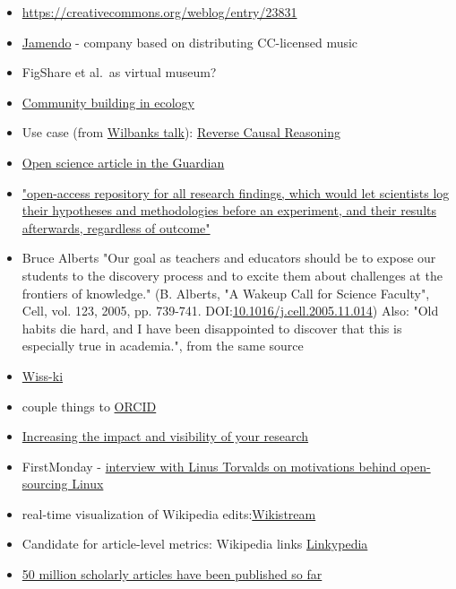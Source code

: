 \documentclass[final,authoryear,3p]{elsarticle-open-drafting}
\begin{document}
\begin{itemize}
	\item \href{https://creativecommons.org/weblog/entry/23831}{https://creativecommons.org/weblog/entry/23831}
	\item \href{http://www.jamendo.com/en/creativecommons}{Jamendo} - company based on distributing CC-licensed music
	\item FigShare et al.\ as virtual museum?
	\item \href{http://dx.doi.org/10.1038/npre.2010.4603.1}{Community building in ecology}
	\item Use case (from \href{}{Wilbanks talk}): \href{http://selventa.com/technology/white-papers}{Reverse Causal Reasoning}
	\item \href{http://www.guardian.co.uk/education/2011/may/22/open-science-shared-research-internet}{Open science article in the Guardian}
	\item \href{http://www.nature.com/news/2011/110223/full/470437a.html}{"open-access repository for all research findings, which would let scientists log their hypotheses and methodologies before an experiment, and their results afterwards, regardless of outcome"}
	\item Bruce Alberts "Our goal as teachers and educators should be to expose our students to the discovery process and to excite them about challenges at the frontiers of knowledge." (B. Alberts, "A Wakeup Call for Science Faculty", Cell, vol. 123, 2005, pp. 739-741. DOI:\href{http://dx.doi.org/10.1016/j.cell.2005.11.014}{10.1016/j.cell.2005.11.014})
	Also: "Old habits die hard, and I have been disappointed to discover that this is especially true in academia.", from the same source
	\item \href{http://wiss-ki.eu/}{Wiss-ki}
	\item couple things to \href{http://orcid.org/}{ORCID}
	\item \href{http://www.jisc.ac.uk/supportingyourinstitution/researchexcellence/researchvisibility.aspx}{Increasing the impact and visibility of your research}
	\item FirstMonday - \href{http://firstmonday.org/htbin/cgiwrap/bin/ojs/index.php/fm/article/view/583/504}{interview with Linus Torvalds on motivations behind open-sourcing Linux}
	\item real-time visualization of Wikipedia edits:\href{https://github.com/edsu/wikistream}{Wikistream} 
	\item Candidate for article-level metrics: Wikipedia links \href{https://github.com/Daniel-Mietchen/linkypedia}{Linkypedia} 
	\item \href{http://dx.doi.org/10.1087/20100308}{50 million scholarly articles have been published so far}

\end{itemize}
\end{document}
